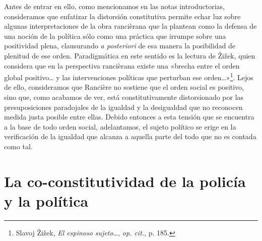 Antes de entrar en ello, como mencionamos en las notas introductorias, consideramos que enfatizar la distorsión constitutiva permite echar luz sobre algunas interpretaciones de la obra rancièrana que la plantean como la defensa de una noción de la política sólo como una práctica que irrumpe sobre una positividad plena, clausurando \emph{a posteriori} de esa manera la posibilidad de plenitud de ese orden. Paradigmática en este sentido es la lectura de Žižek, quien considera que en la perspectiva rancièrana existe una «brecha entre el orden global positivo\ldots{} y las intervenciones políticas que perturban ese orden\ldots»\footnote{Slavoj Žižek, \emph{El espinoso sujeto\ldots{}}, \emph{op. cit.}, p. 185.}. Lejos de ello, consideramos que Rancière no sostiene que el orden social es positivo, sino que, como acabamos de ver, está constitutivamente distorsionado por las presuposiciones paradojales de la igualdad y la desigualdad que no reconocen medida justa posible entre ellas. Debido entonces a esta tensión que se encuentra a la base de todo orden social, adelantamos, el sujeto político se erige en la verificación de la igualdad que alcanza a aquella parte del todo que no es contada como tal.

\section{La co-constitutividad de la policía y la política}

